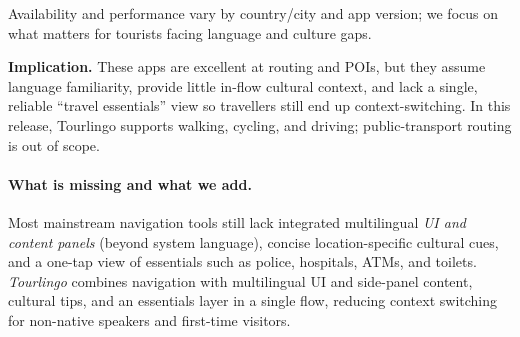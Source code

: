 \begin{sloppypar}
\begin{table}[H]
  \vspace{4pt}
  \footnotesize Availability and performance vary by country/city and app version; we focus on what matters for tourists facing language and culture gaps.
\end{table}

\noindent\textbf{Implication.}
These apps are excellent at routing and POIs, but they assume language familiarity, provide little in-flow cultural context, and lack a single, reliable “travel essentials” view so travellers still end up context-switching. In this release, Tourlingo supports walking, cycling, and driving; public-transport routing is out of scope.

\paragraph{What is missing and what we add.}
Most mainstream navigation tools still lack integrated multilingual \emph{UI and content panels} (beyond system language), concise location-specific cultural cues, and a one-tap view of essentials such as police, hospitals, ATMs, and toilets. \emph{Tourlingo} combines navigation with multilingual UI and side-panel content, cultural tips, and an essentials layer in a single flow, reducing context switching for non-native speakers and first-time visitors.

\end{sloppypar}
